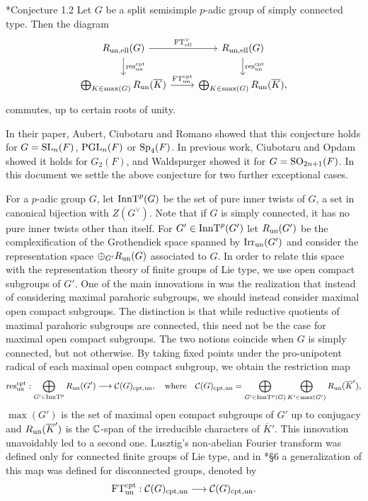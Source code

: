 \begin{conjecture}\label{conj:main}\cite{AubertCiubotaruRomano2024}*{Conjecture 1.2}
    Let $G$ be a split semisimple $p$-adic group of simply connected type. Then the diagram 
    \[
        \begin{tikzcd}
        R_{\un,\text{ell}}(G) \arrow[r, "\FT^\vee_{\text{ell}}"] \arrow[d, "\res_{\un}^{\cpt}"] & R_{\un,\text{ell}}(G) \arrow[d, "\res_{\un}^{\cpt}"] \\
        \bigoplus_{K\in\max(G)}R_{\un}(\overline{K}) \arrow[r, "\FT^{\cpt}_{\un}"] & \bigoplus_{K\in\max(G)}R_{\un}(\overline{K}),
        \end{tikzcd}
    \]
    commutes, up to certain roots of unity.
\end{conjecture}

In their paper, Aubert, Ciubotaru and Romano showed that this conjecture holds for $G=\mathrm{SL}_n(F)$,  $\mathrm{PGL}_n(F)$ or $\mathrm{Sp}_4(F)$. In previous work, Ciubotaru and Opdam \cite{Ciubotaru2020} showed it holds for $G_2(F)$, and Waldspurger \cite{Waldspurger2018} showed it for $G=\mathrm{SO}_{2n+1}(F)$. In this document we settle the above conjecture for two further exceptional cases. 

\iffalse
For a $p$-adic group $G$, let $\mathrm{InnT}^p(G)$ be the set of pure inner twists of $G$, a set in canonical bijection with $Z(G^\vee)$. Note that if $G$ is simply connected, it has no pure inner twists other than itself. For $G'\in\mathrm{InnT}^p(G')$ let $R_{\mathrm{un}}(G')$ be the complexification of the Grothendiek space spanned by $\mathrm{Irr}_{\mathrm{un}}(G')$ and consider the representation space $\oplus_{G'}R_{\mathrm{un}}(G)$ associated to $G$. In order to relate this space with the representation theory of finite groups of Lie type, we use open compact subgroups of $G'$. One of the main innovations in \cite{AubertCiubotaruRomano2024} was the realization that instead of considering maximal parahoric subgroups, we should instead consider maximal open compact subgroups. The distinction is that while reductive quotients of maximal parahoric subgroups are connected, this need not be the case for maximal open compact subgroups. The two notions coincide when $G$ is simply connected, but not otherwise. By taking fixed points under the pro-unipotent radical of each maximal open compact subgroup, we obtain the restriction map 
\begin{equation*}
    \mathrm{res}_{\mathrm{un}}^{\mathrm{cpt}}:\bigoplus_{G'\in\mathrm{InnT}^p} R_{\mathrm{un}}(G')\longrightarrow\mathcal{C}(G)_{\mathrm{cpt},\mathrm{un}},\quad\text{where}\quad\mathcal{C}(G)_{\mathrm{cpt},\mathrm{un}}=\bigoplus_{G'\in\mathrm{InnT}^p(G)}\bigoplus_{K'\in\max(G')}R_{\mathrm{un}}(\overline{K}'),
\end{equation*}
$\max(G')$ is the set of maximal open compact subgroups of $G'$ up to conjugacy and $R_{\mathrm{un}}(\overline{K}')$ is the $\mathbb{C}$-span of the irreducible characters of $\overline{K}'$. This innovation unavoidably led to a second one. Lusztig's non-abelian Fourier transform was defined only for connected finite groups of Lie type, and in \cite{AubertCiubotaruRomano2024}*{\S6} a generalization of this map was defined for disconnected groups, denoted by 
\begin{equation*}
    \mathrm{FT}^{\mathrm{cpt}}_{\mathrm{un}}:\mathcal{C}(G)_{\mathrm{cpt},\mathrm{un}}\longrightarrow\mathcal{C}(G)_{\mathrm{cpt},\mathrm{un}}.
\end{equation*}



